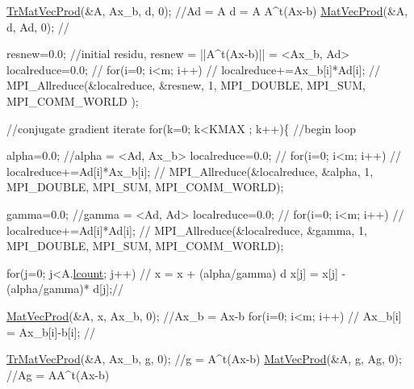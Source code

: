 \begin{DoxyCode}
    \hyperlink{group__matmap__group11_ga1a51d7e8153d33045482100bbd07d0a9}{TrMatVecProd}(&A, Ax\_b, d, 0);         \textcolor{comment}{//Ad = A d =  A A^t(Ax-b)}
    \hyperlink{group__matmap__group12a_gaf757d9249d31d2839b3376ac2e3f5574}{MatVecProd}(&A, d, Ad, 0);             \textcolor{comment}{//}
   
    resnew=0.0;                           \textcolor{comment}{//initial residu, resnew =
       ||A^t(Ax-b)|| = <Ax\_b, Ad>}
    localreduce=0.0;                      \textcolor{comment}{//}
    \textcolor{keywordflow}{for}(i=0; i<m; i++)                    \textcolor{comment}{//         }
      localreduce+=Ax\_b[i]*Ad[i];         \textcolor{comment}{//}
    MPI\_Allreduce(&localreduce, &resnew, 1, MPI\_DOUBLE, MPI\_SUM, MPI\_COMM\_WORLD
      );
   
    \textcolor{comment}{//conjugate gradient iterate}
    \textcolor{keywordflow}{for}(k=0; k<KMAX ; k++)\{               \textcolor{comment}{//begin loop}
   
      alpha=0.0;                          \textcolor{comment}{//alpha = <Ad, Ax\_b>}
      localreduce=0.0;                    \textcolor{comment}{//}
      \textcolor{keywordflow}{for}(i=0; i<m; i++)                  \textcolor{comment}{//         }
        localreduce+=Ad[i]*Ax\_b[i];       \textcolor{comment}{//}
      MPI\_Allreduce(&localreduce, &alpha, 1, MPI\_DOUBLE, MPI\_SUM, 
      MPI\_COMM\_WORLD);
   
      gamma=0.0;                          \textcolor{comment}{//gamma = <Ad, Ad>}
      localreduce=0.0;                    \textcolor{comment}{//}
      \textcolor{keywordflow}{for}(i=0; i<m; i++)                  \textcolor{comment}{//         }
        localreduce+=Ad[i]*Ad[i];         \textcolor{comment}{//}
      MPI\_Allreduce(&localreduce, &gamma, 1, MPI\_DOUBLE, MPI\_SUM, 
      MPI\_COMM\_WORLD);
   
      \textcolor{keywordflow}{for}(j=0; j<A.\hyperlink{structMat_a983857e6f4ddb2c19a5119bcf1b6af63}{lcount}; j++)           \textcolor{comment}{// x = x + (alpha/gamma) d }
        x[j] = x[j] - (alpha/gamma)* d[j];\textcolor{comment}{//}
   
      \hyperlink{group__matmap__group12a_gaf757d9249d31d2839b3376ac2e3f5574}{MatVecProd}(&A, x, Ax\_b, 0);         \textcolor{comment}{//Ax\_b = Ax-b}
      \textcolor{keywordflow}{for}(i=0; i<m; i++)                  \textcolor{comment}{// }
        Ax\_b[i] = Ax\_b[i]-b[i];           \textcolor{comment}{//}
   
      \hyperlink{group__matmap__group11_ga1a51d7e8153d33045482100bbd07d0a9}{TrMatVecProd}(&A, Ax\_b, g, 0);       \textcolor{comment}{//g  = A^t(Ax-b)}
      \hyperlink{group__matmap__group12a_gaf757d9249d31d2839b3376ac2e3f5574}{MatVecProd}(&A, g, Ag, 0);           \textcolor{comment}{//Ag = AA^t(Ax-b)}
   

\end{DoxyCode}
